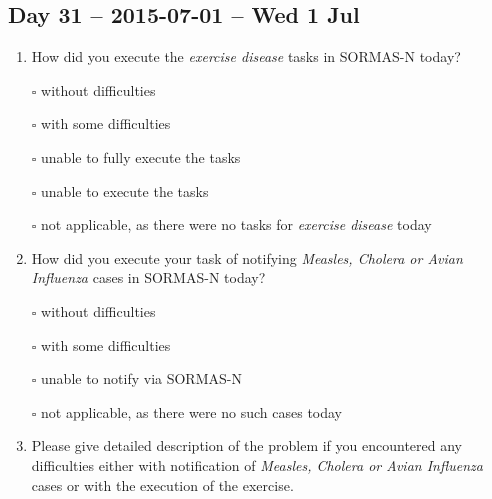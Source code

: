 \documentclass[a4paper, titlepage]{tufte-handout}
\begin{document}
\subsection{Day 31 -- 2015-07-01 -- Wed  1 Jul}
\label{sec-8-23}
\begin{enumerate}
\item How did you execute the \emph{exercise disease} tasks in SORMAS-N today?

\quad $\square$ without difficulties

\quad $\square$ with some difficulties

\quad $\square$ unable to fully execute the tasks

\quad $\square$ unable to execute the tasks

\quad $\square$ not applicable, as there were no tasks for \emph{exercise disease} today

\item How did you execute your task of notifying \emph{Measles, Cholera or Avian Influenza} cases in SORMAS-N today?

\quad $\square$ without difficulties

\quad $\square$ with some difficulties

\quad $\square$ unable to notify via SORMAS-N

\quad $\square$ not applicable, as there were no such cases today

\item Please give detailed description of the problem if you encountered any difficulties either with notification of \emph{Measles, Cholera or Avian Influenza} cases or with the execution of the exercise.

\hrulefill

\hrulefill

\hrulefill

\hrulefill

\hrulefill

\hrulefill

\hrulefill

\hrulefill

\hrulefill

\hrulefill
\end{enumerate}

\newpage
\end{document}
